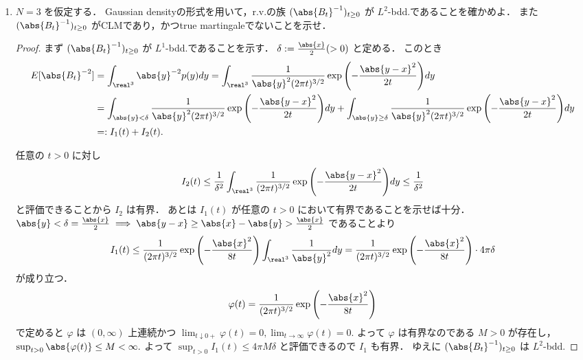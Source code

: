 \documentclass{jsarticle}
\begin{document}
\begin{enumerate}
\begin{proof}
        4.の結果より $\abs{B}^{2-N}$ は非負CLMなので，Prop. 4.7(i)より$\abs{B}^{2-N}$ は非負supermartingale.
        ゆえに任意の $t\ge0$ に対し
        $$
        E[\abs{B_t}^{2-N}]
        \le E[\abs{B_0}^{2-N}]
        = \abs{x}^{2-N}
        $$
        が成り立つので，$\sup_{t\ge0}E[\abs{B_t}^{2-N}]<\infty$ より $\abs{B}^{2-N}$ は $L^1$-bdd.
        よってThm. 3.19より $\abs{B_{\infty}}^{2-N}$ がa.s.で存在するので，$\lim_{t\to\infty}\abs{B_t}$ がa.s.で存在する．
        a.s.で $\limsup_{t\to\infty}B_t^1=\infty$ となるので，a.s.で $\lim_{t\to\infty}\abs{B_t}=\infty.$
    \end{proof}
    
    \item
    $N=3$ を仮定する．
    Gaussian densityの形式を用いて，r.v.の族 $(\abs{B_t}^{-1})_{t\ge0}$ が $L^2$-bdd.であることを確かめよ．
    また $(\abs{B_t}^{-1})_{t\ge0}$ がCLMであり，かつtrue martingaleでないことを示せ．
    \begin{proof}
        まず $(\abs{B_t}^{-1})_{t\ge0}$ が $L^1$-bdd.であることを示す．
        $\delta:=\frac{\abs{x}}{2}(>0)$ と定める．
        このとき
        \begin{align}
            E[\abs{B_t}^{-2}]
            &= \int_{\real^3}\abs{y}^{-2}p(y)dy
            = \int_{\real^3}\frac{1}{\abs{y}^2(2\pi t)^{3/2}}\exp{\left(-\frac{\abs{y-x}^2}{2t}\right)}dy \\
            &= \int_{\abs{y}<\delta}\frac{1}{\abs{y}^2(2\pi t)^{3/2}}\exp{\left(-\frac{\abs{y-x}^2}{2t}\right)}dy
            + \int_{\abs{y}\ge\delta}\frac{1}{\abs{y}^2(2\pi t)^{3/2}}\exp{\left(-\frac{\abs{y-x}^2}{2t}\right)}dy \\
            &=: I_1(t) + I_2(t).
        \end{align}

        任意の $t>0$ に対し
        \begin{align}
            I_2(t)
            \le \frac{1}{\delta^2}\int_{\real^3}\frac{1}{(2\pi t)^{3/2}}\exp{\left(-\frac{\abs{y-x}^2}{2t}\right)}dy
            \le \frac{1}{\delta^2}
        \end{align}
        と評価できることから $I_2$ は有界．
        あとは $I_1(t)$ が任意の $t>0$ において有界であることを示せば十分．
        $\abs{y}<\delta=\frac{\abs{x}}{2}\implies \abs{y-x}\ge\abs{x}-\abs{y}>\frac{\abs{x}}{2}$ であることより
        \begin{align}
            I_1(t)
            \le \frac{1}{(2\pi t)^{3/2}}\exp{\left(-\frac{\abs{x}^2}{8t}\right)}\int_{\real^3}\frac{1}{\abs{y}^2}dy
            = \frac{1}{(2\pi t)^{3/2}}\exp{\left(-\frac{\abs{x}^2}{8t}\right)}\cdot4\pi\delta
        \end{align}
        が成り立つ．
        $$
        \varphi(t)
        = \frac{1}{(2\pi t)^{3/2}}\exp{\left(-\frac{\abs{x}^2}{8t}\right)}
        $$
        で定めると $\varphi$ は $(0,\infty)$ 上連続かつ $\lim_{t\downarrow0+}\varphi(t)=0, \lim_{t\to\infty}\varphi(t)=0.$
        よって $\varphi$ は有界なのである $M>0$ が存在し，$\sup_{t>0}\abs{\varphi(t)}\le M<\infty.$
        よって $\sup_{t>0}I_1(t)\le 4\pi M\delta$ と評価できるので $I_1$ も有界．
        ゆえに $(\abs{B_t}^{-1})_{t\ge0}$ は $L^2$-bdd.


\end{proof}
\end{enumerate}
\end{document}
